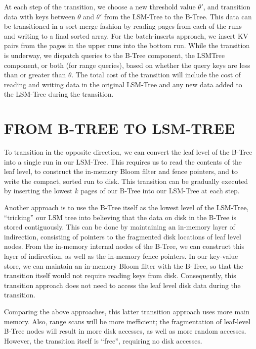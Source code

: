 \documentclass[a4paper,12pt,notitlepage,twoside,openright]{article}
\begin{document}
At each step of the transition, we choose a new threshold value
\(\theta'\), and transition data with keys between
\( \theta \) and \(\theta'\) from the LSM-Tree to the
B-Tree. This data can be transitioned in a sort-merge fashion by reading
pages from each of the runs and writing to a final sorted array. For the
batch-inserts approach, we insert KV pairs from the pages in the upper
runs into the bottom run. While the transition is underway, we dispatch
queries to the B-Tree component, the LSMTree component, or both (for
range queries), based on whether the query keys are less than or greater
than \( \theta \). The total cost of the transition will include the cost of
reading and writing data in the original LSM-Tree and any new data added
to the LSM-Tree during the transition.

\hypertarget{fromb-treetolsm-tree}{%
\section{FROM B-TREE TO LSM-TREE}\label{fromb-treetolsm-tree}}

To transition in the opposite direction, we can convert the leaf level
of the B-Tree into a single run in our LSM-Tree. This requires us to
read the contents of the leaf level, to construct the in-memory Bloom
filter and fence pointers, and to write the compact, sorted run to disk.
This transition can be gradually executed by inserting the lowest
\(k\) pages of our B-Tree into our LSM-Tree at each step.

Another approach is to use the B-Tree itself as the lowest level of the
LSM-Tree, ``tricking'' our LSM tree into believing that the data on disk
in the B-Tree is stored contiguously. This can be done by maintaining an
in-memory layer of indirection, consisting of pointers to the fragmented
disk locations of leaf level nodes. From the in-memory internal nodes of
the B-Tree, we can construct this layer of indirection, as well as the
in-memory fence pointers. In our key-value store, we can maintain an
in-memory Bloom filter with the B-Tree, so that the transition itself
would not require reading keys from disk. Consequently, this transition
approach does not need to access the leaf level disk data during the
transition.

Comparing the above approaches, this latter transition approach uses
more main memory. Also, range scans will be more inefficient; the
fragmentation of leaf-level B-Tree nodes will result in more disk
accesses, as well as more random accesses. However, the transition
itself is ``free'', requiring no disk accesses.
\end{document}
